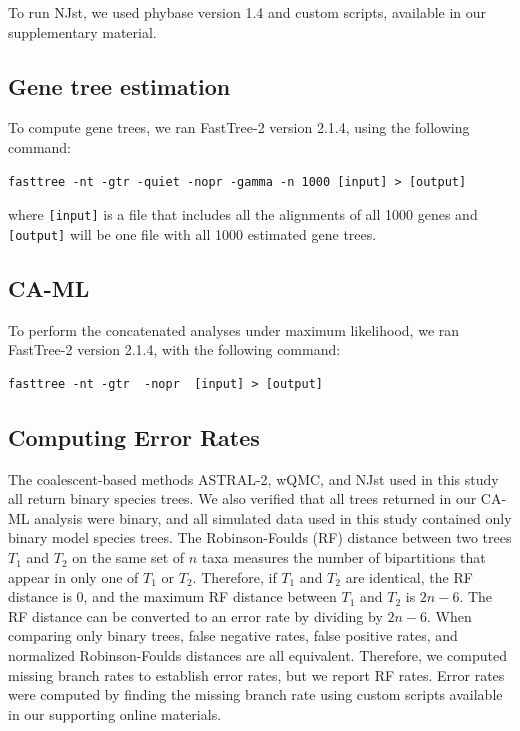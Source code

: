 To run NJst, we used phybase version 1.4 \cite{phybase}
and custom scripts, available in our supplementary material. 


\subsection{Gene tree estimation}
To compute gene trees, we ran FastTree-2  version 2.1.4, using the following command:
\begin{verbatim}
fasttree -nt -gtr -quiet -nopr -gamma -n 1000 [input] > [output]
\end{verbatim}
where {\tt [input]} is a file that includes all the alignments of all 1000 genes and 
{\tt [output]} will be one file with all 1000 estimated gene trees. 

\subsection{CA-ML}
To perform the concatenated  analyses under maximum likelihood,
we ran FastTree-2 version 2.1.4, with the following
command:
\begin{verbatim}
fasttree -nt -gtr  -nopr  [input] > [output]
\end{verbatim}


\subsection{Computing Error Rates}
The coalescent-based methods ASTRAL-2, wQMC, and NJst used in this study all return binary species trees.   We also verified that all trees returned in our CA-ML analysis were binary, and all simulated data used in this study contained only binary model species trees.  The Robinson-Foulds (RF)  distance \cite{RF} between two trees $T_{1}$ and $T_{2}$ on the same set of  $n$ taxa measures the number of bipartitions that appear in only one of $T_{1}$  or $T_{2}$.  Therefore, if $T_{1}$ and $T_{2}$ are identical, the RF distance is 0, and the maximum RF distance between $T_{1}$ and $T_{2}$ is $2n-6$.  The RF distance can be converted to an error rate by dividing by $2n-6$.   When comparing only binary trees, false negative rates, false positive rates, and normalized Robinson-Foulds distances  are all equivalent.  Therefore, we computed missing branch rates to establish error rates, but we report RF rates. Error rates were computed by finding the missing branch rate using custom scripts available in our supporting online materials.  



